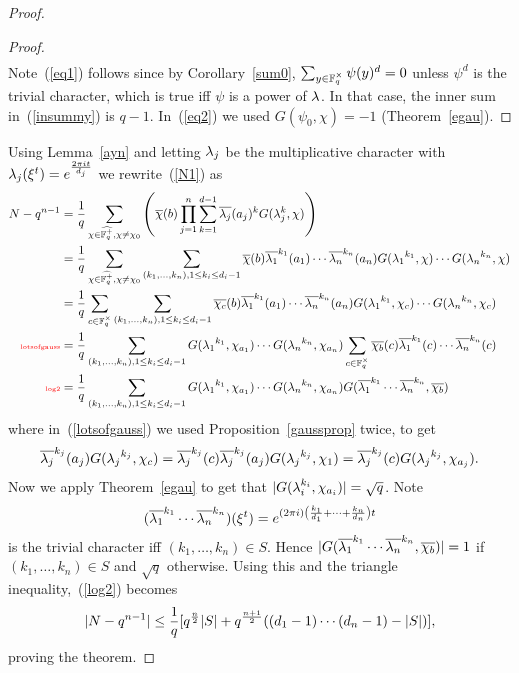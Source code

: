 \begin{proof}
\begin{proof}
\begin{align}
\end{align}
Note~(\ref{eq1}) follows since by Corollary~\ref{sum0}, $\sum_{y\in \mathbb{F}_q^{\times}}\psi(y)^d=0$ unless $\psi^d$ is the trivial character, which is true iff $\psi$ is a power of $\lambda$. In that case, the inner sum in~(\ref{insummy}) is $q-1$. In~(\ref{eq2}) we used $G(\psi_0,\chi)=-1$ (Theorem~\ref{egau}).
\end{proof}
Using Lemma~\ref{ayn} and letting $\lambda_j$ be the multiplicative character with $\lambda_j(\xi^t)=e^{\frac{2\pi it}{d_j}}$ we rewrite~(\ref{N1}) as
\begin{align}
\nonumber
N-q^{n-1}&=\rc{q}\sum_{\chi\in \widehat{\F_q^+}, \chi\neq \chi_0}\pa{\overline{\chi}(b)\prod_{j=1}^n\sum_{k=1}^{d-1}\overline{\la_j}(a_j)^kG(\la_j^k,\chi)}
\\
\nonumber
&=\rc{q}\sum_{\chi\in \widehat{\F_q^+},\chi\neq \chi_0}\sum_{(k_1,\ldots, k_n),1\leq k_i\leq d_i-1}\overline{\chi}(b)
\overline{\la_1}^{k_1}(a_1)\cdots \overline{\la_n}^{k_n}(a_n)
G({\la_1}^{k_1},\chi)\cdots G({\la_n}^{k_n},\chi)
\\
\nonumber
&=\rc{q}\sum_{c\in \F_q^{\times}}\sum_{(k_1,\ldots, k_n),1\leq k_i\leq d_i-1}\overline{\chi_c}(b)
\overline{\la_1}^{k_1}(a_1)\cdots \overline{\la_n}^{k_n}(a_n)
G({\la_1}^{k_1},\chi_c)\cdots G({\la_n}^{k_n},\chi_c)
\\
\llabel{lotsofgauss}
&=
\rc{q}
\sum_{(k_1,\ldots, k_n),1\leq k_i\leq d_i-1}
G({\la_1}^{k_1},\chi_{a_1})\cdots G({\la_n}^{k_n},\chi_{a_n})
\sum_{c\in \F_q^{\times}}
\overline{\chi_b}(c)
\overline{\la_1}^{k_1}(c)\cdots \overline{\la_n}^{k_n}(c)
\\
\llabel{log2}
&=
\rc{q}
\sum_{(k_1,\ldots, k_n),1\leq k_i\leq d_i-1}
G({\la_1}^{k_1},\chi_{a_1})\cdots G({\la_n}^{k_n},\chi_{a_n})
G(\overline{\la_1}^{k_1}\cdots \overline{\la_n}^{k_n},\overline{\chi_b})
\end{align}
where in~(\ref{lotsofgauss}) we used Proposition~\ref{gaussprop} twice, to get \[\overline{\lambda_j}^{k_j}(a_j)G({\lambda_j}^{k_j},\chi_c)=\overline{\lambda_j}^{k_j}(c)\overline{\lambda_j}^{k_j}(a_j)G({\lambda_j}^{k_j},\chi_1)=\overline{\lambda_j}^{k_j}(c)G({\lambda_j}^{k_j},\chi_{a_j}).\]
Now we apply Theorem~\ref{egau} to get that 
$|G(\lambda_i^{k_i},\chi_{a_i})|=\sqrt q$. Note
\[(\overline{\lambda_1}^{k_1}\cdots \overline{\lambda_n}^{k_n})(\xi^t)=e^{(2\pi i)\left( {\frac{k_1}{d_1}+\cdots +\frac{k_n}{d_n}} \right)t}\]
is the trivial character iff $(k_1,\ldots, k_n)\in S$. Hence $|G(\overline{\lambda_1}^{k_1}\cdots \overline{\lambda_n}^{k_n},\overline{\chi_b})|=1$ if $(k_1,\ldots, k_n)\in S$ and $\sqrt{q}$ otherwise.  Using this and the triangle inequality,~(\ref{log2}) becomes
\[
|N-q^{n-1}|\leq\frac{1}{q}[q^{\frac n2}|S|+q^{\frac {n+1}2}((d_1-1)\cdots (d_n-1)-|S|)],
\]
proving the theorem.
\end{proof}
